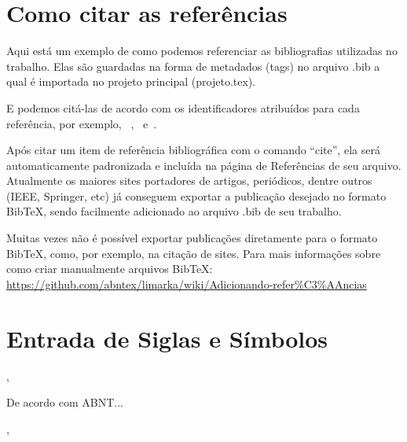 \section{Como citar as referências}
\label{ss.referencias}

Aqui está um exemplo de como podemos referenciar as bibliografias utilizadas no trabalho. Elas são guardadas na forma de metadados (tags) no arquivo .bib a qual é importada no projeto principal (projeto.tex).

E podemos citá-las de acordo com os identificadores atribuídos para cada referência, por exemplo,~\cite{stonebraker93} ,~\cite{rocha09} e~\cite{keras}.

Após citar um item de referência bibliográfica com o comando ``cite'', ela será automaticamente padronizada e incluída na página de Referências de seu arquivo. Atualmente os maiores sites portadores de artigos, periódicos, dentre outros (IEEE, Springer, etc) já conseguem exportar a publicação desejado no formato BibTeX, sendo facilmente adicionado ao arquivo .bib de seu trabalho.

Muitas vezes não é possível exportar publicações diretamente para o formato BibTeX, como, por exemplo, na citação de sites. Para mais informações sobre como criar manualmente arquivos BibTeX: \url{https://github.com/abntex/limarka/wiki/Adicionando-refer%C3%AAncias}

\section{Entrada de Siglas e Símbolos}

, 

De acordo com \acs{ABNT}...






, 


 
